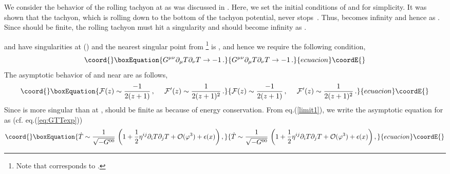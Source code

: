 \documentclass[12pt,a4paper]{article}
\providecommand{\p}{\partial}
\providecommand{\F}{\mathcal{F}}
\providecommand{\calO}{\mathcal{O}}
\begin{document}
We consider the behavior of the rolling tachyon \coordHE{} at \coordHE{} as was discussed in \cite{ST,Mi}.
Here, we set the initial conditions of \coordHE{} and \coordHE{} for
simplicity.
It was shown that the tachyon, which is rolling down to the bottom of
the tachyon potential, never stops~\cite{ST}.
Thus, \coordHE{} becomes infinity and hence \coordHE{} as
\coordHE{}.
Since \coordHE{} should be finite, the rolling
tachyon must hit a singularity and \myHighlight{$\F$}\coordHE{} should become infinity as
\coordHE{}.

\myHighlight{$\F(z)$}\coordHE{} and \myHighlight{$\F'(z)$}\coordHE{} have singularities at \coordHE{}\quad
(\coordHE{}) and the nearest singular point from
\coordHE{}\footnote{Note that \coordHE{} corresponds to \coordHE{}.} is
\coordHE{}, and hence we require the following condition,
\begin{equation}\coord{}\boxEquation{
 \label{limit1}
	G^{\mu\nu}\p_\mu T\p_\nu T\to -1\,.
}{
 G^{\mu\nu}\p_\mu T\p_\nu T\to -1\,.
}{ecuacion}\coordE{}\end{equation}
The asymptotic behavior of \myHighlight{$\F(z)$}\coordHE{} and \myHighlight{$\F'(z)$}\coordHE{}
near \coordHE{} are as follows,
\begin{equation}\coord{}\boxEquation{
 \F(z) \sim \frac{-1}{2(z+1)}\,, \hspace{3ex}
	\F'(z) \sim \frac{1}{2(z+1)^2}\,.\label{Fasym}
}{
 \F(z) \sim \frac{-1}{2(z+1)}\,, \hspace{3ex}
	\F'(z) \sim \frac{1}{2(z+1)^2}\,.}{ecuacion}\coordE{}\end{equation}
Since \myHighlight{$\F'(z)$}\coordHE{} is more singular than \myHighlight{$\F(z)$}\coordHE{} at \coordHE{},
\myHighlight{$e^{-T^2/4}\,\F'$}\coordHE{} should be finite as \coordHE{} because of
energy conservation. From eq.(\ref{limit1}), we write the asymptotic
equation for \coordHE{} as (cf. eq.(\ref{eq:GTTexp}))
\begin{equation}\coord{}\boxEquation{
  \dot{T} \sim \frac{1}{\sqrt{-G^{00}}}\,\left(
	1 +\frac{1}{2}\eta^{ij}\p_i T \p_j T
	+ \calO(\varphi^3)+ \epsilon(x)\right), \label{dT}
}{
  \dot{T} \sim \frac{1}{\sqrt{-G^{00}}}\,\left(
	1 +\frac{1}{2}\eta^{ij}\p_i T \p_j T
	+ \calO(\varphi^3)+ \epsilon(x)\right), }{ecuacion}\coordE{}\end{equation}
\end{document}

